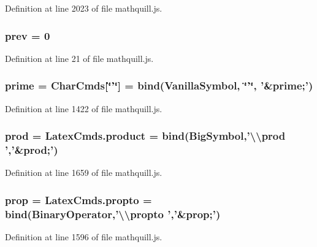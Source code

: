 Definition at line 2023 of file mathquill.\-js.

\subsubsection[{prev}]{\setlength{\rightskip}{0pt plus 5cm}{\bf \-\_\-} prev = 0}\label{mathquill_8js_aab834cbdff049d62c69bfbc30f9bd605}


Definition at line 21 of file mathquill.\-js.

\subsubsection[{prime}]{ prime = {\bf Char\-Cmds}[\char`\"{}'\char`\"{}] = {\bf bind}({\bf Vanilla\-Symbol}, \char`\"{}'\char`\"{}, '\&prime;')}\label{mathquill_8js_ac9fb27284fab531443fd64b9ad0971dc}


Definition at line 1422 of file mathquill.\-js.

\subsubsection[{prod}]{ prod = Latex\-Cmds.\-product = {\bf bind}({\bf Big\-Symbol},'\textbackslash{}\textbackslash{}prod ','\&prod;')}\label{mathquill_8js_a59a82585862ead46758b8ec8ff957af2}


Definition at line 1659 of file mathquill.\-js.

\subsubsection[{prop}]{ prop = Latex\-Cmds.\-propto = {\bf bind}({\bf Binary\-Operator},'\textbackslash{}\textbackslash{}propto ','\&prop;')}\label{mathquill_8js_afbaa480eecea9050f79fd565964fa250}


Definition at line 1596 of file mathquill.\-js.

